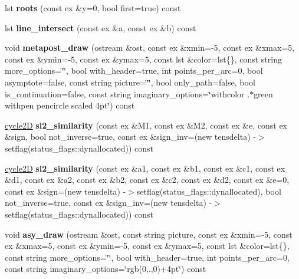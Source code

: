 \begin{DoxyCompactItemize}
lst {\bfseries roots} (const ex \&y=0, bool first=true) const
\item 
\mbox{\label{class_moeb_inv_1_1cycle2_d_a006c6e8a216cee4e6fa1df8fff7f6f8e}} 
lst {\bfseries line\+\_\+intersect} (const ex \&a, const ex \&b) const
\item 
\mbox{\label{class_moeb_inv_1_1cycle2_d_a303f13dc4acb34bd4872d6152d46d8ea}} 
void {\bfseries metapost\+\_\+draw} (ostream \&ost, const ex \&xmin=-\/5, const ex \&xmax=5, const ex \&ymin=-\/5, const ex \&ymax=5, const lst \&color=lst\{\}, const string more\+\_\+options=\char`\"{}\char`\"{}, bool with\+\_\+header=true, int points\+\_\+per\+\_\+arc=0, bool asymptote=false, const string picture=\char`\"{}\char`\"{}, bool only\+\_\+path=false, bool is\+\_\+continuation=false, const string imaginary\+\_\+options=\char`\"{}withcolor .$\ast$green withpen pencircle scaled 4pt\char`\"{}) const
\item 
\mbox{\label{class_moeb_inv_1_1cycle2_d_af6d5250d65c5b89c2ad26a3870260d52}} 
\mbox{\hyperlink{class_moeb_inv_1_1cycle2_d}{cycle2D}} {\bfseries sl2\+\_\+similarity} (const ex \&M1, const ex \&M2, const ex \&e, const ex \&sign, bool not\+\_\+inverse=true, const ex \&sign\+\_\+inv=(new tensdelta) -\/$>$setflag(status\+\_\+flags\+::dynallocated)) const
\item 
\mbox{\label{class_moeb_inv_1_1cycle2_d_ad53312cabcf0a9c4356cc766ddb301ab}} 
\mbox{\hyperlink{class_moeb_inv_1_1cycle2_d}{cycle2D}} {\bfseries sl2\+\_\+similarity} (const ex \&a1, const ex \&b1, const ex \&c1, const ex \&d1, const ex \&a2, const ex \&b2, const ex \&c2, const ex \&d2, const ex \&e=0, const ex \&sign=(new tensdelta) -\/$>$setflag(status\+\_\+flags\+::dynallocated), bool not\+\_\+inverse=true, const ex \&sign\+\_\+inv=(new tensdelta) -\/$>$setflag(status\+\_\+flags\+::dynallocated)) const
\item 
\mbox{\label{class_moeb_inv_1_1cycle2_d_a2af30738cf483468f03ac800c102c62a}} 
void {\bfseries asy\+\_\+draw} (ostream \&ost, const string picture, const ex \&xmin=-\/5, const ex \&xmax=5, const ex \&ymin=-\/5, const ex \&ymax=5, const lst \&color=lst\{\}, const string more\+\_\+options=\char`\"{}\char`\"{}, bool with\+\_\+header=true, int points\+\_\+per\+\_\+arc=0, const string imaginary\+\_\+options=\char`\"{}rgb(0,.,0)+4pt\char`\"{}) const

\end{DoxyCompactItemize}
